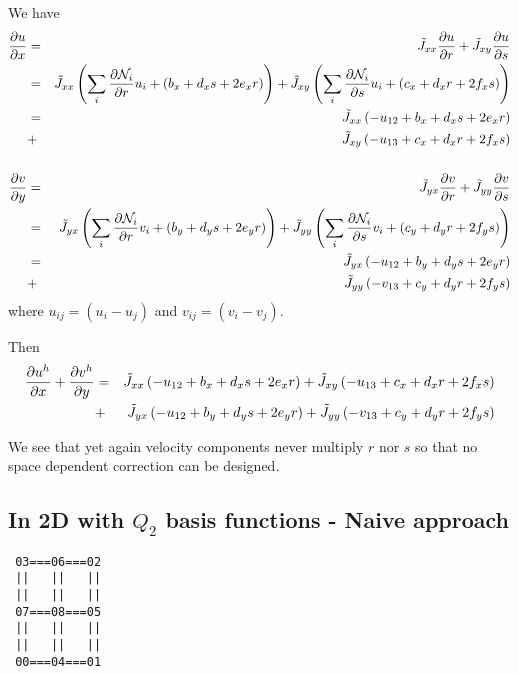 We have
\begin{eqnarray}
\frac{\partial u}{\partial x} 
&=& \tilde{J}_{xx} \frac{\partial u}{\partial r} +  \tilde{J}_{xy} \frac{\partial u}{\partial s}  \nonumber\\
&=& \tilde{J}_{xx} \left( \sum_i \frac{\partial {\mathcal{N}}_i}{\partial r} u_i + (b_x + d_xs + 2e_xr )  \right) 
 +  \tilde{J}_{xy} \left( \sum_i \frac{\partial {\mathcal{N}}_i}{\partial s} u_i + (c_x + d_xr + 2f_xs )  \right)  \nonumber\\
&=& \tilde{J}_{xx} \left( - u_{12} + b_x + d_xs + 2e_xr \right) \nonumber\\ 
&+& \tilde{J}_{xy} \left( - u_{13} + c_x + d_xr + 2f_xs \right) \nonumber\\ 
\nonumber\\
\frac{\partial v}{\partial y} 
&=& \tilde{J}_{yx} \frac{\partial v}{\partial r} +  \tilde{J}_{yy} \frac{\partial v}{\partial s} \nonumber\\
&=& \tilde{J}_{yx} \left(  \sum_i \frac{\partial {\mathcal{N}}_i}{\partial r} v_i + (b_y + d_ys + 2e_yr ) \right)  
+  \tilde{J}_{yy} \left( \sum_i \frac{\partial {\mathcal{N}}_i}{\partial s} v_i + (c_y + d_yr + 2f_ys ) \right) \nonumber\\
&=& \tilde{J}_{yx} \left( -u_{12} + b_y + d_ys + 2e_yr  \right)  \nonumber\\
&+& \tilde{J}_{yy} \left( -v_{13} + c_y + d_yr + 2f_ys  \right) \nonumber
\end{eqnarray}
where $u_{ij}=(u_i-u_j)$ and $v_{ij}=(v_i-v_j)$.

Then 
\begin{eqnarray}
\frac{\partial u^h}{\partial x}
+
\frac{\partial v^h}{\partial y}
&=& \tilde{J}_{xx} \left( - u_{12} + b_x + d_xs + 2e_xr \right) 
+ \tilde{J}_{xy} \left( - u_{13} + c_x + d_xr + 2f_xs \right) \nonumber\\
&+& \tilde{J}_{yx} \left( -u_{12} + b_y + d_ys + 2e_yr  \right) 
+ \tilde{J}_{yy} \left( -v_{13} + c_y + d_yr + 2f_ys  \right) \nonumber
\end{eqnarray}

We see that yet again velocity components never multiply $r$ nor $s$ so that 
no space dependent correction can be designed. 



\subsection{In 2D with $Q_2$ basis functions - Naive approach}

\begin{verbatim}
 03===06===02  
 ||   ||   ||  
 ||   ||   ||  
 07===08===05  
 ||   ||   ||  
 ||   ||   ||  
 00===04===01  
\end{verbatim}

